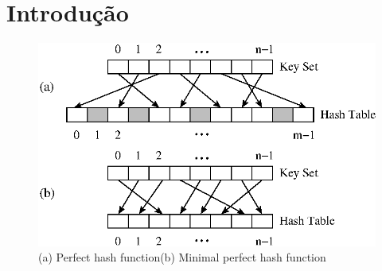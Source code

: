 \section{Introdu\c{c}\~ao}
\label{sec:introduction}
\begin{figure}
\centering
  \includegraphics{figs/minimalperfecthash-ph-mph.ps}
\caption{(a) Perfect hash function\quad  (b) Minimal perfect hash function}
\label{fig:minimalperfecthash-ph-mph}
\end{figure}

